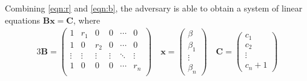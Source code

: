 \documentclass[hyp,a4paper,12pt,openbib]{socreport}
\begin{document}
Combining \ref{eqn:r} and \ref{eqn:b}, the adversary is able to obtain a system of linear equations $\mathbf{Bx=C}$, where 
\begin{alignat}{3}
\label{eqn:matrix} \mathbf{B} = \begin{pmatrix}										
  1 & r_1 & 0 & 0 & \cdots & 0\\
  1 & 0 & r_2 & 0 & \cdots & 0\\
  \vdots & \vdots & \vdots & \vdots & \ddots & \vdots\\
   1 & 0 & 0 & 0 & \cdots & r_n\\
%
 \end{pmatrix} \quad %
\mathbf{x}=\begin{pmatrix} 
 	\beta \\
	\beta_1 \\ 
	\vdots \\
	\beta_n
\end{pmatrix}
 \quad %
\mathbf{C}=\begin{pmatrix} 
 	c_1 \\
	c_2 \\ 
	\vdots \\
	c_n+1
\end{pmatrix}
\end{alignat}
\end{document}
